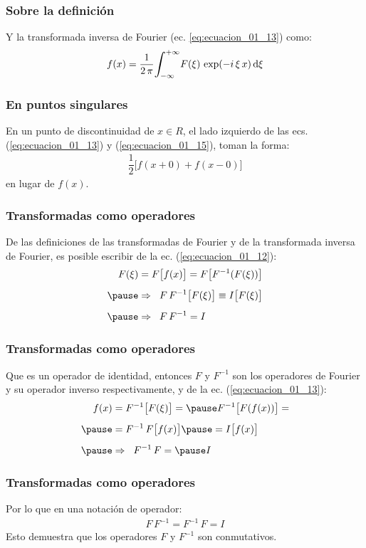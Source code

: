 \begin{frame}
\frametitle{Sobre la definición}
Y la transformada inversa de Fourier (ec. \ref{eq:ecuacion_01_13}) como:
\pause
\begin{eqnarray}
f (x) = \dfrac{1}{2 \, \pi} \scaleint{6ex}_{\bs -\infty}^{+\infty} F (\xi) \, \exp(-i \, \xi \, x) \dd{\xi}
\label{eq:ecuacion_01_15}
\end{eqnarray}
\end{frame}
\begin{frame}
\frametitle{En puntos singulares}
En un punto de discontinuidad de $x \in R$, el lado izquierdo de las ecs. (\ref{eq:ecuacion_01_13}) y (\ref{eq:ecuacion_01_15}), toman la forma:
\pause
\begin{align*}
\dfrac{1}{2} \big[ f (x + 0) + f (x - 0) \big]
\end{align*}
en lugar de $f (x)$.
\end{frame}
\begin{frame}
\frametitle{Transformadas como operadores}
De las definiciones de las transformadas de Fourier y de la transformada inversa de Fourier, es posible escribir de la ec. (\ref{eq:ecuacion_01_12}):
\pause
\begin{eqnarray*}
\begin{aligned}
F (\xi) &= F \big[ f (x) \big] = F \big[ F^{-1} (F (\xi)) \big] \\[0.5em] \pause
&\Rightarrow \hspace{0.2cm} F \, F^{-1} \big[ F (\xi) \big] \equiv I \big[ F (\xi) \big] \\[0.5em] \pause
&\Rightarrow \hspace{0.2cm} F \, F^{-1} = I
\end{aligned}
\end{eqnarray*}
\end{frame}
\begin{frame}
\frametitle{Transformadas como operadores}
Que es un operador de identidad, entonces $F$ y $F^{-1}$ son los operadores de Fourier y su operador inverso respectivamente, y de la ec. (\ref{eq:ecuacion_01_13}):
\pause
\begin{eqnarray}
\begin{aligned}[b]
f (x) &= F^{-1} \big[ F (\xi) \big] = \pause F^{-1} \big[ F(f (x)) \big] = \\[0.5em] \pause 
&= F^{-1} \, F \big[ f (x) \big] \pause = I \big[ f (x) \big] \\[0.5em] \pause
&\Rightarrow \hspace{0.2cm} F^{-1} \, F = \pause I
\end{aligned}
\label{eq:ecuacion_01_16}
\end{eqnarray}
\end{frame}
\begin{frame}
\frametitle{Transformadas como operadores}    
Por lo que en una notación de operador:
\pause
\begin{align*}
F \, F^{-1} = F^{-1} \, F = I
\end{align*}
\pause
Esto demuestra que los operadores $F$ y $F^{-1}$ son conmutativos.
\end{frame}

